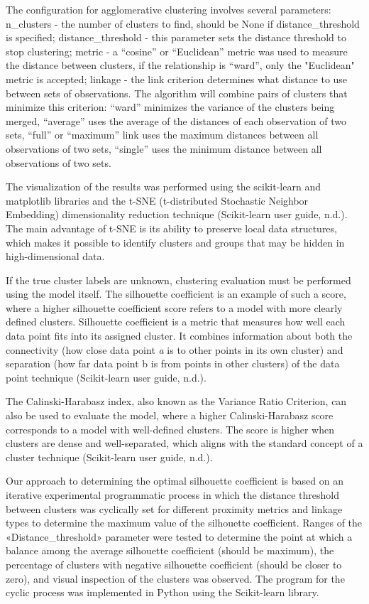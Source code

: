 The configuration for agglomerative clustering involves several
parameters: n\_clusters - the number of clusters to find, should be None
if distance\_threshold is specified; distance\_threshold - this
parameter sets the distance threshold to stop clustering; metric - a
``cosine'' or ``Euclidean'' metric was used to measure the distance
between clusters, if the relationship is ``ward'', only the "Euclidean"
metric is accepted; linkage - the link criterion determines what
distance to use between sets of observations. The algorithm will combine
pairs of clusters that minimize this criterion: ``ward'' minimizes the
variance of the clusters being merged, ``average'' uses the average of
the distances of each observation of two sets, ``full'' or ``maximum''
link uses the maximum distances between all observations of two sets,
``single'' uses the minimum distance between all observations of two
sets.

The visualization of the results was performed using the scikit-learn
and matplotlib libraries and the t-SNE (t-distributed Stochastic
Neighbor Embedding) dimensionality reduction technique (Scikit-learn
user guide, n.d.). The main advantage of t-SNE is its ability to
preserve local data structures, which makes it possible to identify
clusters and groups that may be hidden in high-dimensional data.

If the true cluster labels are unknown, clustering evaluation must be
performed using the model itself. The silhouette coefficient is an
example of such a score, where a higher silhouette coefficient score
refers to a model with more clearly defined clusters. Silhouette
coefficient is a metric that measures how well each data point fits into
its assigned cluster. It combines information about both the
connectivity (how close data point \emph{a} is to other points in its
own cluster) and separation (how far data point b is from points in
other clusters) of the data point technique (Scikit-learn user guide,
n.d.).

The Calinski-Harabasz index, also known as the Variance Ratio Criterion,
can also be used to evaluate the model, where a higher Calinski-Harabasz
score corresponds to a model with well-defined clusters. The score is
higher when clusters are dense and well-separated, which aligns with the
standard concept of a cluster technique (Scikit-learn user guide, n.d.).

Our approach to determining the optimal silhouette coefficient is based
on an iterative experimental programmatic process in which the distance
threshold between clusters was cyclically set for different proximity
metrics and linkage types to determine the maximum value of the
silhouette coefficient. Ranges of the «Distance\_threshold» parameter
were tested to determine the point at which a balance among the average
silhouette coefficient (should be maximum), the percentage of clusters
with negative silhouette coefficient (should be closer to zero), and
visual inspection of the clusters was observed. The program for the
cyclic process was implemented in Python using the Scikit-learn library.

